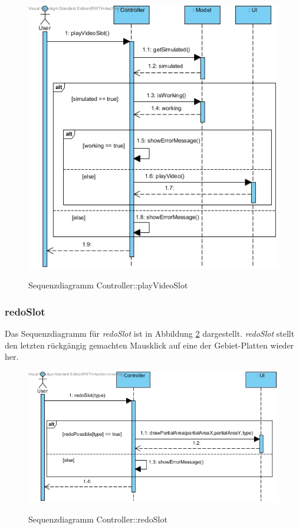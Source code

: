 \begin{figure}[H]
	\centering
	\includegraphics[scale=.55]{Bilder/Controller__playVideoSlot().jpg}\\
	\caption{Sequenzdiagramm Controller::playVideoSlot}
	\label{Sequenzdiagramm Controller::playVideoSlot}
\end{figure}

\subsubsection*{redoSlot}

Das Sequenzdiagramm für \emph{redoSlot} ist in Abbildung \ref{Sequenzdiagramm Controller::redoSlot} dargestellt. \emph{redoSlot} stellt den letzten rückgängig gemachten Mausklick auf eine der Gebiet-Platten wieder her.

\begin{figure}[H]
	\centering
	\includegraphics[scale=.7]{Bilder/Controller__redoSlot().jpg}\\
	\caption{Sequenzdiagramm Controller::redoSlot}
	\label{Sequenzdiagramm Controller::redoSlot}
\end{figure}

